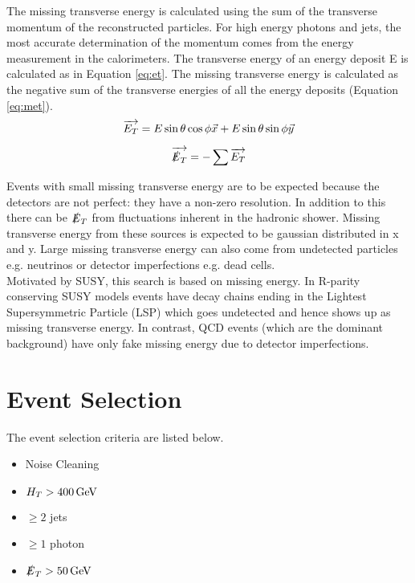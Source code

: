 The missing transverse energy is calculated using the sum of the transverse
momentum of the reconstructed particles. For high energy photons and jets, the 
most accurate determination of the momentum comes from the energy measurement in
the calorimeters. The transverse energy of an energy deposit E is calculated as 
in Equation \ref{eq:et}. The missing transverse energy is calculated as the
negative sum of the transverse energies of all the energy deposits (Equation
\ref{eq:met}). \\

\begin{equation}
\overrightarrow{E_{T}} = E\sin{\theta}\cos{\phi}\vec{x} + E\sin{\theta}\sin{\phi}\vec{y}
\label{eq:et}
\end{equation}

\begin{equation}
\overrightarrow{\slashed{E}_{T}} = - \sum \overrightarrow{E_{T}}
\label{eq:met}
\end{equation}

Events with small missing transverse energy are to be expected because the 
detectors are not perfect: they have a non-zero resolution. In addition to this
there can be $\slashed{E}_{T}$ from fluctuations inherent in the hadronic shower. Missing
transverse energy from these sources is expected to be gaussian distributed in x
and y. Large missing transverse energy can also come from undetected particles 
e.g. neutrinos or detector imperfections e.g. dead cells. \\

Motivated by SUSY, this search is based on missing energy. In R-parity
conserving SUSY models events have decay chains ending in the Lightest 
Supersymmetric Particle (LSP) which goes undetected and hence shows up as 
missing transverse energy. In contrast, QCD events (which are the dominant 
background) have only fake missing energy due to detector imperfections. \\

\section{Event Selection}
\label{sec:Event_Selection}

The event selection criteria are listed below. 

\begin{itemize}
\item Noise Cleaning
\item $H_{T} > 400 \, \mathrm{GeV}$
\item $\geq 2$ jets
\item $\geq 1$ photon
\item $\slashed{E}_{T} > 50 \, \mathrm{GeV}$
\end{itemize}

